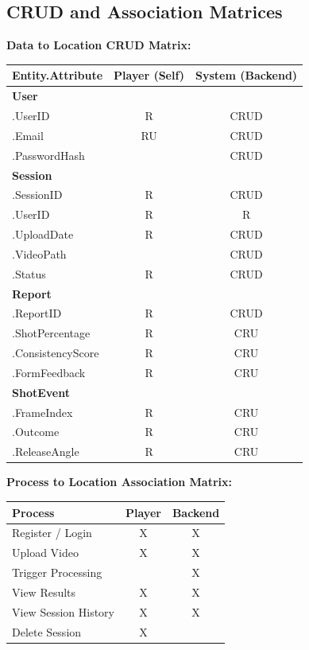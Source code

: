 ﻿\documentclass[11pt,a4paper]{article}
\begin{document}
\subsection{CRUD and Association Matrices}

\textbf{Data to Location CRUD Matrix:}

\begin{longtable}{|L{5.5cm}|c|c|}
\hline
\textbf{Entity.Attribute} & \textbf{Player (Self)} & \textbf{System (Backend)} \\ \hline
\textbf{User} & & \\ \hline
\quad .UserID & R & CRUD \\ \hline
\quad .Email & RU & CRUD \\ \hline
\quad .PasswordHash & & CRUD \\ \hline
\textbf{Session} & & \\ \hline
\quad .SessionID & R & CRUD \\ \hline
\quad .UserID & R & R \\ \hline
\quad .UploadDate & R & CRUD \\ \hline
\quad .VideoPath & & CRUD \\ \hline
\quad .Status & R & CRUD \\ \hline
\textbf{Report} & & \\ \hline
\quad .ReportID & R & CRUD \\ \hline
\quad .ShotPercentage & R & CRU \\ \hline
\quad .ConsistencyScore & R & CRU \\ \hline
\quad .FormFeedback & R & CRU \\ \hline
\textbf{ShotEvent} & & \\ \hline
\quad .FrameIndex & R & CRU \\ \hline
\quad .Outcome & R & CRU \\ \hline
\quad .ReleaseAngle & R & CRU \\ \hline
\end{longtable}

\textbf{Process to Location Association Matrix:}

\begin{tabular}{|L{6cm}|c|c|}
\hline
\textbf{Process} & \textbf{Player} & \textbf{Backend} \\ \hline
Register / Login & X & X \\ \hline
Upload Video & X & X \\ \hline
Trigger Processing & & X \\ \hline
View Results & X & X \\ \hline
View Session History & X & X \\ \hline
Delete Session & X & \\ \hline
\end{tabular}
\end{document}
